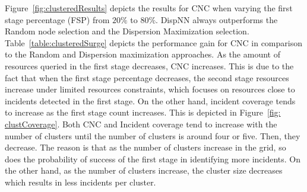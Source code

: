 \documentclass{acm_proc_article-sp}
\begin{document}
Figure~\ref{fig:clusteredResults} depicts the results for CNC when varying the first stage percentage (FSP) from $20\%$ to $80\%$. DispNN always outperforms the Random node selection and the Dispersion Maximization selection. Table~\ref{table:clusteredSurge} depicts the performance gain for CNC in comparison to the Random and Dispersion maximization approaches. As the amount of resources queried in the first stage decreases, CNC increases. This is due to the fact that when the first stage percentage decreases, the second stage resources increase under limited resources constraints, which focuses on resources close to incidents detected in the first stage. On the other hand, incident coverage tends to increase as the first stage count increases. This is depicted in Figure~\ref{fig: clustCoverage}. Both CNC and Incident coverage tend to increase with the number of clusters until the number of clusters is around four or five. Then, they decrease. The reason is that as the number of clusters increase in the grid, so does the probability of success of the first stage in identifying more incidents. On the other hand, as the number of clusters increase, the cluster size decreases which results in less incidents per cluster. 

\end{document}
